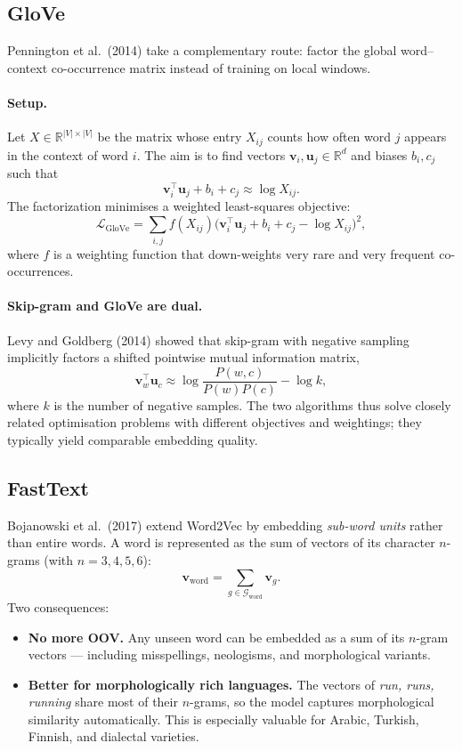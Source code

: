 \subsection{GloVe}

Pennington et al.\ (2014) take a complementary route: factor the global word--context co-occurrence matrix instead of training on local windows.

\paragraph{Setup.} Let $X \in \mathbb{R}^{|V| \times |V|}$ be the matrix whose entry $X_{ij}$ counts how often word $j$ appears in the context of word $i$. The aim is to find vectors $\mathbf{v}_i, \mathbf{u}_j \in \mathbb{R}^d$ and biases $b_i, c_j$ such that
\[ \mathbf{v}_i^\top \mathbf{u}_j + b_i + c_j \approx \log X_{ij}. \]
The factorization minimises a weighted least-squares objective:
\[ \mathcal{L}_{\text{GloVe}} = \sum_{i, j} f(X_{ij}) \big( \mathbf{v}_i^\top \mathbf{u}_j + b_i + c_j - \log X_{ij} \big)^2, \]
where $f$ is a weighting function that down-weights very rare and very frequent co-occurrences.

\paragraph{Skip-gram and GloVe are dual.} Levy and Goldberg (2014) showed that skip-gram with negative sampling implicitly factors a shifted pointwise mutual information matrix,
\[ \mathbf{v}_w^\top \mathbf{u}_c \approx \log \frac{P(w, c)}{P(w) P(c)} - \log k, \]
where $k$ is the number of negative samples. The two algorithms thus solve closely related optimisation problems with different objectives and weightings; they typically yield comparable embedding quality.

\subsection{FastText}

Bojanowski et al.\ (2017) extend Word2Vec by embedding \emph{sub-word units} rather than entire words. A word is represented as the sum of vectors of its character $n$-grams (with $n = 3, 4, 5, 6$):
\[ \mathbf{v}_{\text{word}} = \sum_{g \in \mathcal{G}_{\text{word}}} \mathbf{v}_g. \]
Two consequences:
\begin{itemize}
    \item \textbf{No more OOV.} Any unseen word can be embedded as a sum of its $n$-gram vectors --- including misspellings, neologisms, and morphological variants.
    \item \textbf{Better for morphologically rich languages.} The vectors of \emph{run, runs, running} share most of their $n$-grams, so the model captures morphological similarity automatically. This is especially valuable for Arabic, Turkish, Finnish, and dialectal varieties.
\end{itemize}

